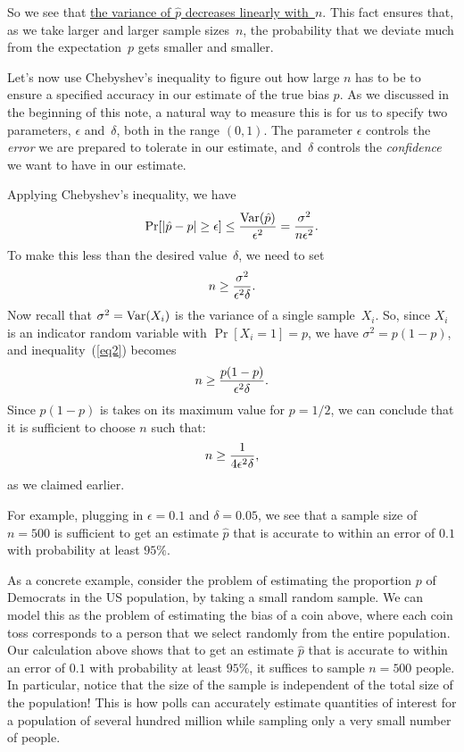 \documentclass[11pt]{article}
\def\ul#1{\underline{#1}}
\def\Var#1{{\rm Var}(#1)}
\begin{document}
So we see that \ul{the variance of $\hat p$ decreases
linearly with~$n$}. This fact ensures that, as we take larger
and larger sample sizes~$n$, the probability that we deviate much
from the expectation~$p$ gets smaller and smaller.

Let's now use Chebyshev's inequality to figure out how large $n$ has
to be to ensure a specified accuracy in our estimate of the true bias $p$.
As we discussed in the beginning of this note, a natural way to measure this is for
us to specify two parameters, $\epsilon$ and~$\delta$, both in the
range $(0,1)$. The parameter $\epsilon$ controls the {\it error\/}
we are prepared to tolerate in our estimate, and~$\delta$ controls
the {\it confidence\/} we want to have in our estimate.

Applying Chebyshev's inequality, we have 
$$
   \Pr[|\hat p-p|\ge \epsilon] \le \frac{\Var{\hat p}}{\epsilon^2}
                              = \frac{\sigma^2}{n\epsilon^2}.  $$
To make this less than the desired value~$\delta$, we need to set
\begin{equation}\label{eq2}
   n\ge {{\sigma^2}\over{\epsilon^2\delta}}.
\end{equation}
Now recall that $\sigma^2=\Var{X_i}$ is the variance of a single
sample~$X_i$.  So, since $X_i$ is an indicator random variable with $\Pr[X_i = 1] = p$, we have
$\sigma^2 = p(1-p)$, and inequality~(\ref{eq2}) becomes
\begin{equation}\label{eq3}
   n\ge {{p(1-p)}\over {\epsilon^2\delta}}.
\end{equation}
Since $p(1-p)$ is takes on its maximum value for $p=1/2$, we can conclude
that it is sufficient to choose $n$ such that:
\begin{equation}\label{eq3}
   n\ge {{1}\over {4\epsilon^2\delta}},
\end{equation}
as we claimed earlier.

For example, plugging in $\epsilon=0.1$ and $\delta=0.05$, we see that a sample
size of $n=500$ is sufficient to get an estimate $\hat p$ that is accurate to within an error
of $0.1$ with probability at least $95\%$.

As a concrete example, consider the problem of estimating the proportion $p$ of
Democrats in the US population, by taking a small random sample. We can model this
as the problem of estimating the bias of a coin above, where each coin toss corresponds
to a person that we select randomly from the entire population. Our calculation above shows that
to get an estimate $\hat p$ that is accurate to within an error of $0.1$ with probability at least
$95\%$, it suffices to sample $n = 500$ people. In particular, notice that the size of the sample
is independent of the total size of the  population! This is how polls can accurately estimate quantities
of interest for  a population of several hundred million while sampling only a very small number
of people.  
\end{document}
